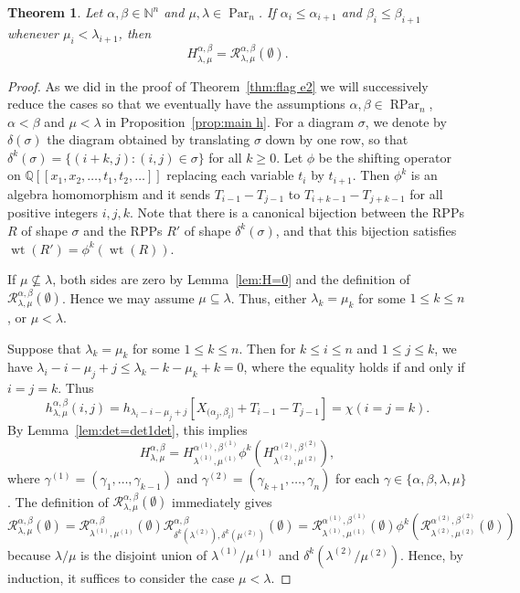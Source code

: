 \documentclass[12pt]{amsart}
\numberwithin{equation}{section}
\newtheorem{thm}{Theorem}[section]
\theoremstyle{definition}
\newcommand\NN{\mathbb{N}}
\newcommand\Par{\operatorname{Par}}
\newcommand\RPar{\operatorname{RPar}}
\newcommand\lm{{\lambda/\mu}}
\newcommand\wt{\operatorname{wt}}
\newcommand\R{\mathcal{R}}
\begin{document}
\begin{thm}\label{thm:flag h2}
  Let $\alpha,\beta\in\NN^n$ and $\mu,\lambda\in\Par_n$.
If
  $\alpha_i\le \alpha_{i+1}$ and $\beta_i\le \beta_{i+1}$ whenever
  $\mu_i<\lambda_{i+1}$, then
\[
H_{\lambda,\mu}^{\alpha,\beta} = \R_{\lambda,\mu}^{\alpha,\beta}(\emptyset).
\]
\end{thm}
\begin{proof}
  As we did in the proof of Theorem~\ref{thm:flag e2} we will successively
  reduce the cases so that we eventually have the assumptions
  $\alpha,\beta\in\RPar_n$, $\alpha<\beta$ and $\mu<\lambda$ in
  Proposition~\ref{prop:main h}. For a diagram $\sigma$, we denote by
  $\delta(\sigma)$ the diagram obtained by translating $\sigma$ down by one row,
  so that $\delta^k(\sigma)=\{(i+k,j): (i,j)\in \sigma\}$ for all $k\ge0$. Let
  $\phi$ be the shifting operator on $\mathbb{Q}[[x_1,x_2,\dots,t_1,t_2,\dots]]$
  replacing each variable $t_i$ by $t_{i+1}$. Then $\phi^k$ is an algebra
  homomorphism and it sends $T_{i-1} - T_{j-1}$ to $T_{i+k-1} - T_{j+k-1}$ for
  all positive integers $i, j, k$. Note that there is a canonical bijection
  between the RPPs $R$ of shape $\sigma$ and the RPPs $R'$ of shape
  $\delta^k(\sigma)$, and that this bijection satisfies $ \wt(R') =
  \phi^k(\wt(R))$.

  If $\mu\not\subseteq\lambda$, both sides are zero by Lemma~\ref{lem:H=0} and
  the definition of $\R_{\lambda,\mu}^{\alpha,\beta}(\emptyset)$. Hence we may
  assume $\mu\subseteq\lambda$. Thus, either $\lambda_k = \mu_k$ for some $1 \le
  k \le n$, or $\mu < \lambda$.

  Suppose that $\lambda_k=\mu_k$ for some $1\le k\le n$. Then for $k\le i\le n$
  and $1\le j\le k$, we have $\lambda_i-i-\mu_j+j\le \lambda_k-k-\mu_k+k=0$,
  where the equality holds if and only if $i=j=k$. Thus
  \[
    h^{\alpha,\beta}_{\lambda,\mu}(i,j) =
    h_{\lambda_i-i-\mu_j+j}[X_{(\alpha_j,\beta_i]}+T_{i-1}-T_{j-1}] = \chi(i=j=k).
  \]
  By Lemma~\ref{lem:det=det1det}, this implies
  \[
    H_{\lambda,\mu}^{\alpha,\beta} = H_{\lambda^{(1)},\mu^{(1)}}^{\alpha^{(1)},\beta^{(1)}}
    \phi^k\left(H_{\lambda^{(2)},\mu^{(2)}}^{\alpha^{(2)},\beta^{(2)}}\right),
  \]
  where $\gamma^{(1)}=(\gamma_1,\dots,\gamma_{k-1})$ and
  $\gamma^{(2)}=(\gamma_{k+1},\dots,\gamma_{n})$ for each
  $\gamma\in\{\alpha,\beta,\lambda,\mu\}$. The definition of
  $\R_{\lambda,\mu}^{\alpha,\beta}(\emptyset)$ immediately gives
  \[
    \R_{\lambda,\mu}^{\alpha,\beta}(\emptyset) =
    \R_{\lambda^{(1)},\mu^{(1)}}^{\alpha,\beta}(\emptyset)
    \R_{\delta^k(\lambda^{(2)}),\delta^k(\mu^{(2)})}^{\alpha,\beta}(\emptyset)
    =\R_{\lambda^{(1)},\mu^{(1)}}^{\alpha^{(1)},\beta^{(1)}}(\emptyset)
    \phi^k\left(\R_{\lambda^{(2)},\mu^{(2)}}^{\alpha^{(2)},\beta^{(2)}}(\emptyset)\right)
  \]
  because $\lm$ is the disjoint union of $\lambda^{(1)}/\mu^{(1)}$ and
  $\delta^k(\lambda^{(2)}/\mu^{(2)})$. Hence, by induction, it suffices to
  consider the case $\mu<\lambda$.


\end{proof}
\end{document}
